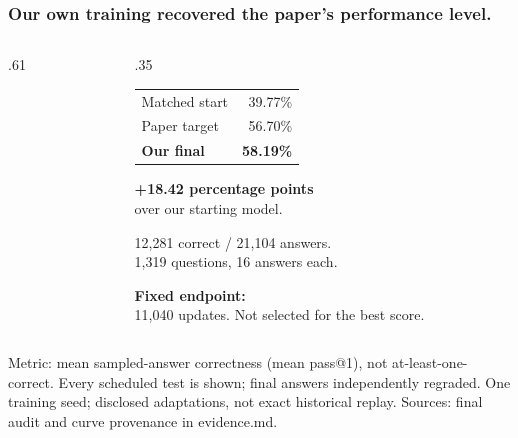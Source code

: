 \documentclass[aspectratio=169,11pt]{beamer}
\newcommand{\source}[1]{\vfill{\scriptsize\color{Gray}#1\par}}
\begin{document}
\begin{frame}[t]
\frametitle{Our own training recovered the paper's performance level.}
\begin{columns}[T,onlytextwidth]
\begin{column}{.61\textwidth}
\end{column}
\begin{column}{.35\textwidth}
\small
\begin{tabular}{@{}lr@{}}
Matched start & 39.77\%\\
Paper target & 56.70\%\\
\textbf{Our final} & \textbf{58.19\%}\\
\end{tabular}
\medskip

\textbf{+18.42 percentage points}\\
over our starting model.
\medskip

12,281 correct / 21,104 answers.\\
1,319 questions, 16 answers each.
\medskip

\textbf{Fixed endpoint:}\\
11,040 updates. Not selected for the best score.
\end{column}
\end{columns}
\source{Metric: mean sampled-answer correctness (mean pass@1), not at-least-one-correct. Every scheduled test is shown; final answers independently regraded. One training seed; disclosed adaptations, not exact historical replay. Sources: final audit and curve provenance in evidence.md.}
\end{frame}
\end{document}
